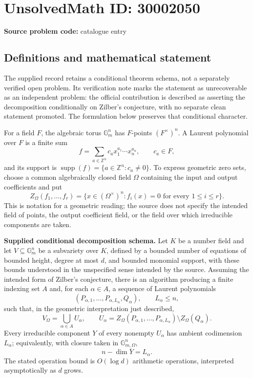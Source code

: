 \documentclass[11pt]{article}
\newcommand{\Z}{\mathbb{Z}}
\begin{document}
\section*{UnsolvedMath ID: 30002050}
\textbf{Source problem code:} catalogue entry
\subsection{Definitions and mathematical statement}
The supplied record retains a conditional theorem schema, not a separately verified open problem. Its verification note marks the statement as unrecoverable as an independent problem: the official contribution is described as asserting the decomposition conditionally on Zilber's conjecture, with no separate clean statement promoted. The formulation below preserves that conditional character.

For a field \(F\), the algebraic torus \(\mathbb G_m^n\) has \(F\)-points \((F^\times)^n\). A Laurent polynomial over \(F\) is a finite sum
\[
f=\sum_{a\in\Z^n}c_a x_1^{a_1}\cdots x_n^{a_n},\qquad c_a\in F,
\]
and its support is \(\operatorname{supp}(f)=\{a\in\Z^n:c_a\ne0\}\). To express geometric zero sets, choose a common algebraically closed field \(\Omega\) containing the input and output coefficients and put
\[
Z_\Omega(f_1,\ldots,f_r)=\{x\in(\Omega^\times)^n:f_i(x)=0\text{ for every }1\le i\le r\}.
\]
This is notation for a geometric reading; the source does not specify the intended field of points, the output coefficient field, or the field over which irreducible components are taken.

\textbf{Supplied conditional decomposition schema.} Let \(K\) be a number field and let \(V\subseteq\mathbb G_m^n\) be a subvariety over \(K\), defined by a bounded number of equations of bounded height, degree at most \(d\), and bounded monomial support, with these bounds understood in the unspecified sense intended by the source. Assuming the intended form of Zilber's conjecture, there is an algorithm producing a finite indexing set \(A\) and, for each \(\alpha\in A\), a sequence of Laurent polynomials
\[
(P_{\alpha,1},\ldots,P_{\alpha,L_\alpha},Q_\alpha),\qquad L_\alpha\le n,
\]
such that, in the geometric interpretation just described,
\[
V_\Omega=\bigcup_{\alpha\in A}U_\alpha,\qquad
U_\alpha=Z_\Omega(P_{\alpha,1},\ldots,P_{\alpha,L_\alpha})\setminus Z_\Omega(Q_\alpha).
\]
Every irreducible component \(Y\) of every nonempty \(U_\alpha\) has ambient codimension \(L_\alpha\); equivalently, with closure taken in \(\mathbb G_{m,\Omega}^n\),
\[
n-\dim\overline{Y}=L_\alpha.
\]
The stated operation bound is \(O(\log d)\) arithmetic operations, interpreted asymptotically as \(d\) grows.
\end{document}

